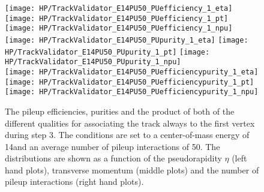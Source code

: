 \begin{figure}[!h]
  \centering
  \texttt{[image: HP/TrackValidator\_E14PU50\_PUefficiency\_1\_eta]}
  \texttt{[image: HP/TrackValidator\_E14PU50\_PUefficiency\_1\_pt]}
  \texttt{[image: HP/TrackValidator\_E14PU50\_PUefficiency\_1\_npu]}
   \\
  \texttt{[image: HP/TrackValidator\_E14PU50\_PUpurity\_1\_eta]}
  \texttt{[image: HP/TrackValidator\_E14PU50\_PUpurity\_1\_pt]}
  \texttt{[image: HP/TrackValidator\_E14PU50\_PUpurity\_1\_npu]}
   \\
  \texttt{[image: HP/TrackValidator\_E14PU50\_PUefficiencypurity\_1\_eta]}
  \texttt{[image: HP/TrackValidator\_E14PU50\_PUefficiencypurity\_1\_pt]}
  \texttt{[image: HP/TrackValidator\_E14PU50\_PUefficiencypurity\_1\_npu]}
  \caption[Pileup efficiencies, purities and their product of the different qualities of the association map with associating the track always to the first vertex during step 3 with 14\TeV and $\left<PU\right>=50$]{The pileup efficiencies, purities and the product of both of the different qualities for associating the track always to the first vertex during step 3. The conditions are set to a center-of-mass energy of 14\TeV and an average number of pileup interactions of 50. The distributions are shown as a function of the pseudorapidity $\eta$ (left hand plots), transverse momentum (middle plots) and the number of pileup interactions (right hand plots).}
\end{figure}
\clearpage

